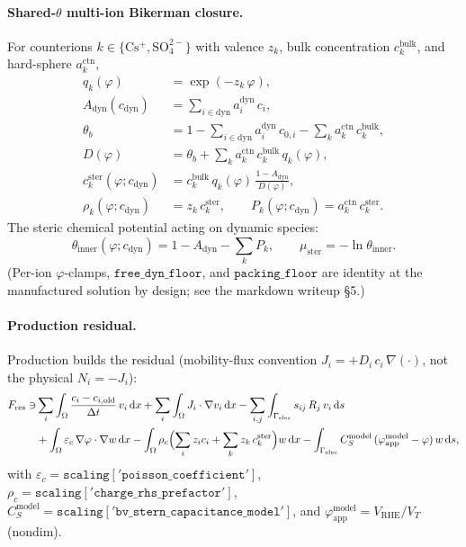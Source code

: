 \documentclass[11pt]{article}
\newcommand{\elec}{\mathrm{elec}}
\newcommand{\ster}{\mathrm{ster}}
\newcommand{\dyn}{\mathrm{dyn}}
\newcommand{\bulk}{\mathrm{bulk}}
\newcommand{\app}{\mathrm{app}}
\newcommand{\modl}{\mathrm{model}}
\begin{document}
\paragraph{Shared-$\theta$ multi-ion Bikerman closure.}
For counterions $k \in \{\mathrm{Cs^+}, \mathrm{SO_4^{2-}}\}$ with valence
$z_k$, bulk concentration $c_k^\bulk$, and hard-sphere $a_k^{\mathrm{ctn}}$,
\begin{align}
  q_k(\varphi)        &= \exp(-z_k\, \varphi), \\
  A_\dyn(c_\dyn)      &= \sum_{i \in \dyn} a_i^\dyn\, c_i, \\
  \theta_b            &= 1 - \sum_{i \in \dyn} a_i^\dyn\, c_{0,i}
                          - \sum_k a_k^{\mathrm{ctn}}\, c_k^\bulk, \\
  D(\varphi)          &= \theta_b + \sum_k a_k^{\mathrm{ctn}}\, c_k^\bulk\,
                          q_k(\varphi), \\
  c_k^\ster(\varphi; c_\dyn)
                      &= c_k^\bulk\, q_k(\varphi)\, \frac{1 - A_\dyn}{D(\varphi)}, \\
  \rho_k(\varphi; c_\dyn) &= z_k\, c_k^\ster, \qquad
  P_k(\varphi; c_\dyn) = a_k^{\mathrm{ctn}}\, c_k^\ster.
\end{align}
The steric chemical potential acting on dynamic species:
\begin{equation}
  \theta_\mathrm{inner}(\varphi; c_\dyn) = 1 - A_\dyn - \sum_k P_k,
  \qquad
  \mu_\ster = -\ln \theta_\mathrm{inner}.
\end{equation}
(Per-ion $\varphi$-clamps, $\mathtt{free\_dyn\_floor}$, and
$\mathtt{packing\_floor}$ are identity at the manufactured solution by
design; see the markdown writeup \S5.)

\paragraph{Production residual.} Production builds the residual (mobility-flux
convention $J_i = +D_i\, c_i\, \nabla(\cdot)$, not the physical
$N_i = -J_i$):
\begin{align}
  F_\mathrm{res} \ni
  &\sum_{i} \int_\Omega \frac{c_i - c_{i,\mathrm{old}}}{\Delta t}\, v_i\, \mathrm{d}x
   + \sum_i \int_\Omega J_i \cdot \nabla v_i\, \mathrm{d}x
   - \sum_{i,j} \int_{\Gamma_\elec} s_{ij}\, R_j\, v_i\, \mathrm{d}s
   \notag\\
  &+ \int_\Omega \varepsilon_c\, \nabla \varphi \cdot \nabla w\, \mathrm{d}x
   - \int_\Omega \rho_c \Bigl(\sum_i z_i c_i + \sum_k z_k\, c_k^\ster\Bigr) w\, \mathrm{d}x
   - \int_{\Gamma_\elec} C_S^\modl\, (\varphi_\app^\modl - \varphi)\, w\, \mathrm{d}s,
   \label{eq:Fres}
\end{align}
with $\varepsilon_c = \mathtt{scaling['poisson\_coefficient']}$,
$\rho_c = \mathtt{scaling['charge\_rhs\_prefactor']}$, $C_S^\modl =
\mathtt{scaling['bv\_stern\_capacitance\_model']}$, and
$\varphi_\app^\modl = V_\mathrm{RHE}/V_T$ (nondim).
\end{document}
